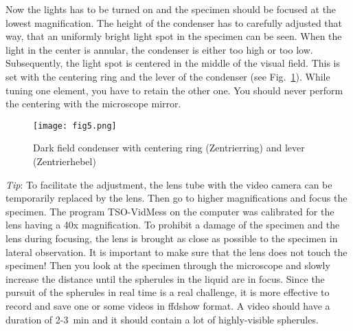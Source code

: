 \documentclass{tudphygp_eng}
\begin{document}
Now the lights has to be turned on and the specimen should be focused at the lowest magnification. The height of the condenser has to carefully adjusted that way, that an uniformly bright light spot in the specimen can be seen. When the light in the center is annular, the condenser is either too high or too low. Subsequently, the light spot is centered in the middle of the visual field. This is set with the centering ring and the lever of the condenser (see Fig.~\ref{fig5}). While tuning one element, you have to retain the other one. You should never perform the centering with the microscope mirror.

\begin{figure}[h]
\begin{center}
\texttt{[image: fig5.png]} 
\caption{Dark field condenser with centering ring (\grqq{}Zentrierring\grqq{}) and lever (\grqq{}Zentrierhebel\grqq{})}
\label{fig5}
\end{center}
\end{figure}

\emph{Tip}: To facilitate the adjustment, the lens tube with the video camera can be temporarily replaced by the lens. Then go to higher magnifications and focus the specimen. The program TSO-VidMess on the computer was calibrated  for the lens having a 40x magnification. To prohibit a damage of the specimen and the lens during focusing, the lens is brought as close as possible to the specimen in lateral observation. It is important to make sure that the lens does not touch the specimen! Then you look at the specimen through the microscope and slowly increase the distance until the spherules in the liquid are in focus. Since the pursuit of the spherules in real time is a real challenge, it is more effective to record and save one or some videos in \grqq{}ffdshow\grqq{} format. A video should have a duration of 2-3~min and it should contain a lot of highly-visible spherules.
\end{document}
